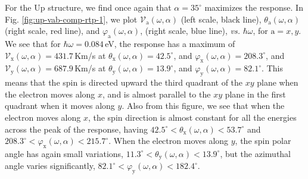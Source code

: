 \documentclass[floatfix,prb,aps,superscriptaddress,showpacs,11pt,preprint,letterpaper]{revtex4}
\begin{document}
For the Up structure, we find once again that  $\alpha=35^{\circ}$ maximizes
the response. In Fig. \ref{fig:up-vab-comp-rtp-1}, we plot
$\mathcal{V}_{\mathrm{a}} (\omega,\alpha)$ (left scale, black line),
$\theta_{\mathrm{a}} (\omega,\alpha)$ (right scale, red line), and
$\varphi_{\mathrm{a}} (\omega,\alpha)$, (right scale, blue line), {\it vs.}
$\hbar\omega$, for $\mathrm{a}=x,y$. We see that for $\hbar\omega=0.084$\,eV,
the response has a maximum of $\mathcal{V}_{\mathrm{x}}
(\omega,\alpha)=431.7$\,Km/s at $\theta_{\mathrm{x}}(\omega,\alpha) =
42.5^{\circ}$, and $\varphi_{\mathrm{x}}(\omega,\alpha) = 208.3^{\circ}$, and
$\mathcal{V}_{\mathrm{y}} (\omega,\alpha)=687.9$\,Km/s at
$\theta_{\mathrm{y}}(\omega,\alpha) = 13.9^{\circ}$, and $\varphi_{\mathrm{y}}
(\omega,\alpha) = 82.1^{\circ}$. This means that the spin is directed upward
the third quadrant of the $xy$ plane when the electron moves along
$x$, and is almost parallel to the $xy$ plane in the first quadrant
when it moves along $y$. Also from this figure, we see that when the electron
moves along $x$, the spin direction is almost constant for all the energies
across the peak of the response, having $42.5^{\circ}<\theta_{\mathrm{x}}
(\omega,\alpha)<53.7^{\circ}$ and $208.3^{\circ}<\varphi_{\mathrm{x}}
(\omega,\alpha)<215.7^{\circ}$. When the electron moves along $y$, the spin
polar angle has again small variations, $11.3^{\circ}<
\theta_{\mathrm{y}}(\omega,\alpha)<13.9^{\circ}$, but the azimuthal angle
varies significantly, $82.1^{\circ}< \varphi_{\mathrm{y}}
(\omega,\alpha)<182.4^{\circ}$.
\end{document}
